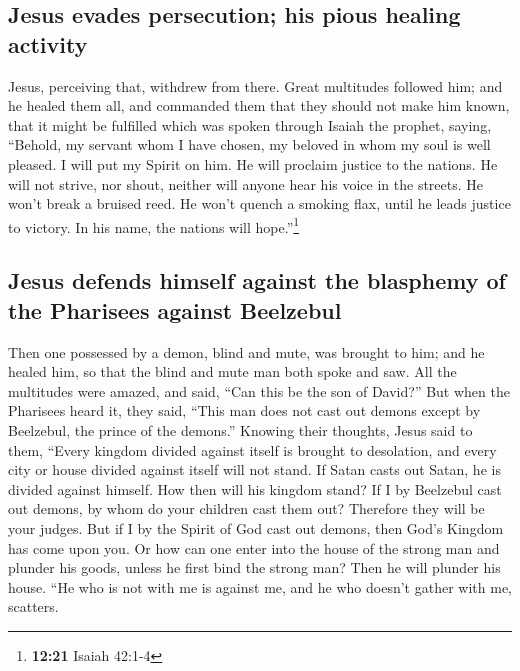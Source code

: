 \hypertarget{jesus-evades-persecution-his-pious-healing-activity}{%
\subsection{Jesus evades persecution; his pious healing
activity}\label{jesus-evades-persecution-his-pious-healing-activity}}

 Jesus, perceiving that, withdrew from there. Great
multitudes followed him; and he healed them all,  and
commanded them that they should not make him known,  that
it might be fulfilled which was spoken through Isaiah the prophet,
saying,  ``Behold, my servant whom I have chosen, my
beloved in whom my soul is well pleased. I will put my Spirit on him. He
will proclaim justice to the nations.  He will not
strive, nor shout, neither will anyone hear his voice in the streets.
 He won't break a bruised reed. He won't quench a smoking
flax, until he leads justice to victory.  In his name,
the nations will hope.''\footnote{\textbf{12:21} Isaiah 42:1-4}

\hypertarget{jesus-defends-himself-against-the-blasphemy-of-the-pharisees-against-beelzebul}{%
\subsection{Jesus defends himself against the blasphemy of the Pharisees
against
Beelzebul}\label{jesus-defends-himself-against-the-blasphemy-of-the-pharisees-against-beelzebul}}

 Then one possessed by a demon, blind and mute, was
brought to him; and he healed him, so that the blind and mute man both
spoke and saw.  All the multitudes were amazed, and said,
``Can this be the son of David?''  But when the Pharisees
heard it, they said, ``This man does not cast out demons except by
Beelzebul, the prince of the demons.''  Knowing their
thoughts, Jesus said to them, ``Every kingdom divided against itself is
brought to desolation, and every city or house divided against itself
will not stand.  If Satan casts out Satan, he is divided
against himself. How then will his kingdom stand?  If I
by Beelzebul cast out demons, by whom do your children cast them out?
Therefore they will be your judges.  But if I by the
Spirit of God cast out demons, then God's Kingdom has come upon you.
 Or how can one enter into the house of the strong man
and plunder his goods, unless he first bind the strong man? Then he will
plunder his house.  ``He who is not with me is against
me, and he who doesn't gather with me, scatters.

